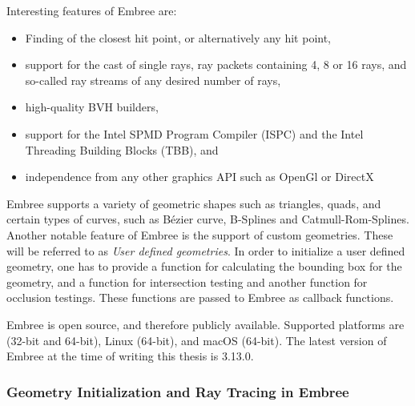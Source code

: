 Interesting features of Embree are:
\begin{itemize}
	\setlength\itemsep{0.05em}
	\item 	Finding of the closest hit point, or alternatively any hit point,
	\item 	support for the cast of single rays, ray packets containing 4, 8 or 16 rays, and so-called ray streams of any desired number of rays,
	\item 	high-quality BVH builders,
	\item 	support for the Intel SPMD Program Compiler (ISPC) and the Intel Threading Building Blocks (TBB), and
	\item 	independence from any other graphics API such as OpenGl or DirectX
\end{itemize}

Embree supports a variety of geometric shapes such as triangles, quads, and certain types of curves, such as Bézier curve, B-Splines and Catmull-Rom-Splines.
Another notable feature of Embree is the support of custom geometries. These will be referred to as \emph{User defined geometries}. In order to initialize a user defined geometry, one has to provide a function for calculating the bounding box for the geometry, and a function for intersection testing and another function for occlusion testings. These functions are passed to Embree as callback functions.

Embree is open source, and therefore publicly available. Supported platforms are (32-bit and 64-bit), Linux (64-bit), and macOS (64-bit). The latest version of Embree at the time of writing this thesis is 3.13.0. 

\subsubsection{Geometry Initialization and Ray Tracing in Embree}



